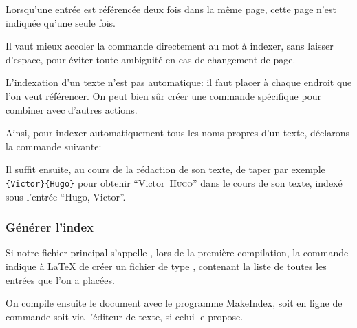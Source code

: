  Lorsqu'une entrée est référencée deux fois dans la même page, cette page n'est indiquée qu'une seule fois. 

\begin{attention}
Il vaut mieux accoler la commande  directement au  mot à indexer, sans laisser d'espace, pour éviter toute ambiguité en cas de changement de page.

\end{attention}


L'indexation d'un texte n'est pas automatique: il faut placer  à chaque endroit  que l'on veut référencer. On  peut bien sûr créer une commande  spécifique pour combiner avec d'autres actions.

Ainsi, pour indexer automatiquement tous les noms propres d'un texte, déclarons la commande suivante:\label{indexauteur}
\begin{latexcode}
\newcommand\auteur[2]{#1~\textsc{#2}\index{#2, #1}\xspace}
\end{latexcode}
\renewcommand\auteur[2]{#1~\textsc{#2}\xspace}

Il suffit ensuite, au cours de la rédaction de son texte, de taper par exemple \verb|{Victor}{Hugo}| pour obtenir \enquote{\auteur{Victor}{Hugo}} dans le cours de son texte, indexé sous l'entrée \enquote{Hugo, Victor}.


\subsubsection{Générer l'index}

Si notre fichier principal s'appelle , lors de la première compilation, la commande  indique à \LaTeX{} de créer un fichier de type , contenant la liste de toutes les entrées que l'on a placées. 
 




On compile ensuite le document avec le programme MakeIndex, soit  en ligne de commande  soit via l'éditeur de texte, si celui le propose.

